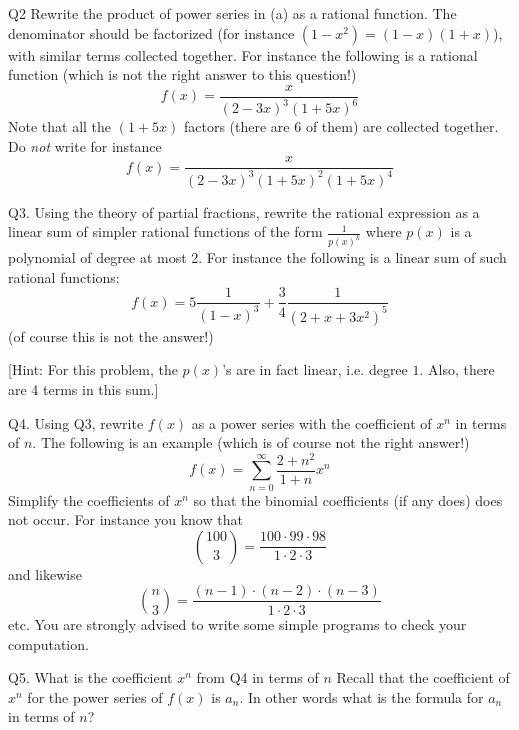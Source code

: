 \documentclass[a4paper,12pt]{article}
\begin{document}
\SOLUTION



\newpage

Q2 Rewrite the product of power series in (a) as a rational function.
The denominator should be factorized
(for instance $(1 - x^2) = (1 - x)(1 + x)$), 
with similar terms collected together.
For instance the following is a rational function 
(which is not the right answer to this question!)
\[
f(x) = \frac{x}{(2 - 3x)^3(1 + 5x)^6}
\]
Note that all the $(1 + 5x)$ factors (there are 6 of them) 
are collected together.
Do {\it not} write for instance
\[
f(x) = \frac{x}{(2 - 3x)^3(1 + 5x)^2(1 + 5x)^4}
\]

\SOLUTION







\newpage
Q3.
Using the theory of partial fractions,
rewrite the rational expression as a linear sum of simpler rational functions 
of the form $\frac{1}{p(x)^k}$ where $p(x)$ is a polynomial of degree
at most 2. 
For instance the following is a linear sum of such rational functions:
\[
f(x) = 5 \frac{1}{(1 - x)^3} + \frac{3}{4} \frac{1}{(2 + x + 3x^2)^5}
\]
(of course this is not the answer!)

[Hint: For this problem, the $p(x)$'s are in fact linear, i.e. degree $1$.
Also, there are 4 terms in this sum.]

\SOLUTION






\newpage
Q4.
Using Q3, rewrite $f(x)$ as a power series with the coefficient of $x^n$
in terms of $n$.
The following is an example (which is of course not the right answer!)
\[
f(x) = \sum_{n=0}^\infty \frac{2 + n^2}{1 + n} x^n
\]
Simplify the coefficients of $x^n$ so that the binomial coefficients
(if any does) does not occur.
For instance you know that
\[
\binom{100}{3} = \frac{100 \cdot 99 \cdot 98}{1 \cdot 2 \cdot 3}
\]
and likewise
\[
\binom{n}{3} = \frac{(n-1) \cdot (n-2) \cdot (n-3)}{1 \cdot 2 \cdot 3}
\]
etc.
You are strongly advised to write some simple programs to check your
computation.
\SOLUTION






\newpage
Q5. 
What is the coefficient $x^n$ from Q4 in terms of $n$
Recall that the coefficient of $x^n$ for the power series of
$f(x)$ is $a_n$.
In other words what is the formula for $a_n$ in terms of $n$?
\end{document}
